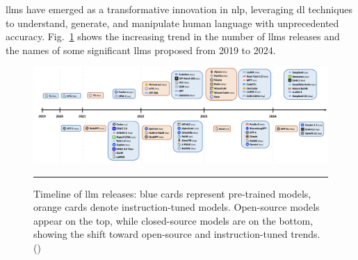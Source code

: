 \glspl{llm} have emerged as a transformative innovation in \gls{nlp}, leveraging \gls{dl} techniques to understand, generate, and manipulate human language with unprecedented accuracy.
Fig.~\ref{fig:llms-over-the-years} shows the increasing trend in the number of \glspl{llm} releases and the names of some significant \glspl{llm} proposed from 2019 to 2024.

\begin{figure}[htbp]
    \centering
 \includegraphics[width=.9\textwidth]{figures/literature-review/llms-over-the-years.png}
     \rule{35em}{0.5pt}
    \caption{Timeline of \gls{llm} releases: blue cards represent pre-trained models, orange cards denote instruction-tuned models. Open-source models appear on the top, while closed-source models are on the bottom, showing the shift toward open-source and instruction-tuned trends. (\textcite{Naveed2023})}
 \label{fig:llms-over-the-years}
\end{figure}

